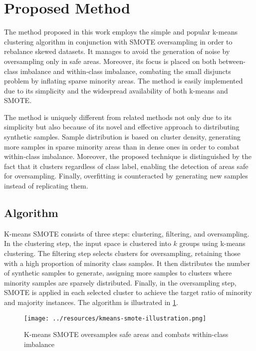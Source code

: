 \documentclass[sort&compress]{elsarticle}
\begin{document}
\section{Proposed Method}
\label{sec:proposed-method}
The method proposed in this work employs the simple and popular k-means clustering algorithm in conjunction with \ac{SMOTE} oversampling in order to rebalance skewed datasets. It manages to avoid the generation of noise by oversampling only in safe areas. Moreover, its focus is placed on both between-class imbalance and within-class imbalance, combating the small disjuncts problem by inflating sparse minority areas. The method is easily implemented due to its simplicity and the widespread availability of both k-means and \ac{SMOTE}.

The method is uniquely different from related methods not only due to its simplicity but also because of its novel and effective approach to distributing synthetic samples. Sample distribution is based on cluster density, generating more samples in sparse minority areas than in dense ones in order to combat within-class imbalance. Moreover, the proposed technique is distinguished by the fact that it clusters regardless of class label, enabling the detection of areas safe for oversampling. Finally, overfitting is counteracted by generating new samples instead of replicating them.

	\subsection{Algorithm}
	K-means \ac{SMOTE} consists of three steps: clustering, filtering, and oversampling. In the clustering step, the input space is clustered into $k$ groups using k-means clustering. The filtering step selects clusters for oversampling, retaining those with a high proportion of minority class samples. It then distributes the number of synthetic samples to generate, assigning more samples to clusters where minority samples are sparsely distributed. Finally, in the oversampling step, \ac{SMOTE} is applied in each selected cluster to achieve the target ratio of minority and majority instances. The algorithm is illustrated in \cref{fig:kmeans-smote-illustration}.

    \begin{figure}[ht]
	\centering
	\texttt{[image: ../resources/kmeans-smote-illustration.png]}
	\caption[K-means \acs{SMOTE} oversamples safe areas and combats within-class imbalance]{K-means \ac{SMOTE} oversamples safe areas and combats within-class imbalance\protect\footnotemark}
    \label{fig:kmeans-smote-illustration}
	\end{figure}
\end{document}
